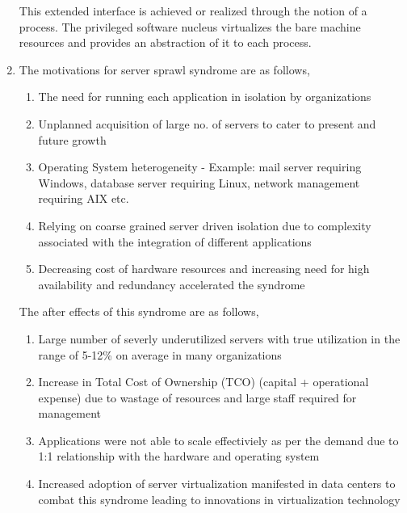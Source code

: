 \documentclass[11pt,a4paper,oneside]{article}
\begin{document}
\begin{enumerate}
		      This extended interface is achieved or realized through the notion of a process. The privileged software nucleus virtualizes the bare machine resources and provides an abstraction of it to each process.
				  
		\item The motivations for server sprawl syndrome are as follows,
		     \begin{enumerate}
		     	\item The need for running each application in isolation by organizations	
		     	\item Unplanned acquisition of large no. of servers to cater to present and future growth
		     	\item Operating System heterogeneity - Example: mail server requiring Windows, database server requiring Linux, network management requiring AIX etc.
		     	\item Relying on coarse grained server driven isolation due to complexity associated with the integration of different applications 
		     	\item Decreasing cost of hardware resources and increasing need for high availability and redundancy accelerated the syndrome  	
		     \end{enumerate}
	          The after effects of this syndrome are as follows,
	          \begin{enumerate}
	          	\item Large number of severly underutilized servers with true utilization in the range of 5-12\% on average in many organizations
	          	\item Increase in Total Cost of Ownership (TCO) (capital + operational expense) due to wastage of resources and large staff required for management
	          	\item Applications were not able to scale effectiviely as per the demand due to 1:1 relationship with the hardware and operating system
	          	\item Increased adoption of server virtualization manifested in data centers to combat this syndrome leading to innovations in virtualization technology   	
	          \end{enumerate}
          

\end{enumerate}
\end{document}
